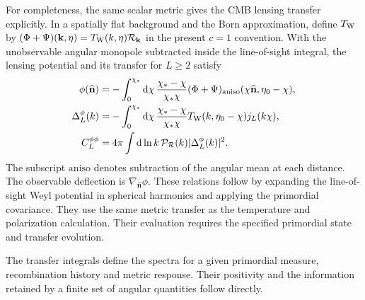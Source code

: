 For completeness, the same scalar metric gives the CMB lensing transfer explicitly. In a spatially flat background and the Born approximation, define $T_{\rm W}$ by $(\Phi+\Psi)(\mathbf k,\eta)=T_{\rm W}(k,\eta)\mathcal R_{\mathbf k}$ in the present $c=1$ convention. With the unobservable angular monopole subtracted inside the line-of-sight integral, the lensing potential and its transfer for $L\geq2$ satisfy \cite{Lewis06}
\begin{align}
\phi(\widehat{\mathbf n})&=-\int_0^{\chi_*}\mathrm{d}\chi\,
\frac{\chi_*-\chi}{\chi_*\chi}(\Phi+\Psi)_{\rm aniso}(\chi\widehat{\mathbf n},\eta_0-\chi),\\
\Delta_L^\phi(k)&=-\int_0^{\chi_*}\mathrm{d}\chi\,
\frac{\chi_*-\chi}{\chi_*\chi}T_{\rm W}(k,\eta_0-\chi)j_L(k\chi),\\
C_L^{\phi\phi}&=4\pi\int\mathrm{d}\ln k\,
\mathcal P_{\mathcal R}(k)|\Delta_L^\phi(k)|^2.\label{eq:cmb-lensing-transfer}
\end{align}
The subscript $\mathrm{aniso}$ denotes subtraction of the angular mean at each distance. The observable deflection is $\nabla_{\widehat{\mathbf n}}\phi$. These relations follow by expanding the line-of-sight Weyl potential in spherical harmonics and applying the primordial covariance. They use the same metric transfer as the temperature and polarization calculation. Their evaluation requires the specified primordial state and transfer evolution.

The transfer integrals define the spectra for a given primordial measure, recombination history and metric response. Their positivity and the information retained by a finite set of angular quantities follow directly.


